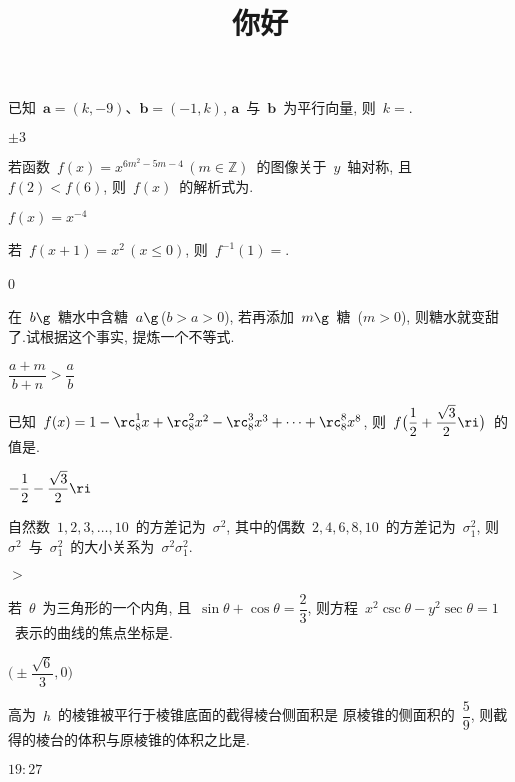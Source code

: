 \documentclass[UTF8,printbox]{BHCexam}
\begin{document}
\title{你好}
\maketitle
\notice

\begin{questions}
\tiankong
\question 已知~$\bm{a}=(k,-9)$、$\bm{b}=(-1,k)$, $\bm{a}$~与~$\bm{b}$~为平行向量,
    则~$k=$\sixb.
\begin{solution}
$\pm3$
\end{solution}
\question 若函数~$f(x)=x^{6m^2-5m-4}\,(m\in\mathbb{Z})$~的图像关于~$y$~轴对称,
    且~$f(2)<f(6)$, 则~$f(x)$~的解析式为\tenb.
\begin{solution}
$f(x)=x^{-4}$
\end{solution}

\question 若~$f(x+1)=x^2\,(x\leq0)$, 则~$f^{-1}(1)=$\sixb.
\begin{solution}
0
\end{solution}

\question 在~$b\g$~糖水中含糖~$a\g$\,($b>a>0$), 若再添加~$m\g$~糖~($m>0$),
    则糖水就变甜了.试根据这个事实, 提炼一个不等式\tenb.
\begin{solution}
$\dfrac{a+m}{b+n}>\dfrac{a}{b}$
\end{solution}

\question 已知~$f(x)=1-\rc_8^1x+\rc_8^2x^2-\rc_8^3x^3+\cdots+\rc_8^8x^8$,
    则~$f\big(\dfrac{1}{2}+\dfrac{\sqrt{3}}{2}\ri\big)$~的值是\sixb\twob{}.
\begin{solution}
$-\dfrac{1}{2}-\dfrac{\sqrt{3}}{2}\ri$
\end{solution}

\question 自然数~$1,2,3,\ldots,10$~的方差记为~$\sigma^2$,
    其中的偶数~$2,4,6,8,10$~的方差记为~$\sigma_1^2$,
    则~$\sigma^2$~与~$\sigma_1^2$~的大小关系为~$\sigma^2$\sixb$\sigma_1^2$.
\begin{solution}
$>$
\end{solution}

\question 若~$\theta$~为三角形的一个内角, 且~$\sin\theta+\cos\theta=\dfrac{2}{3}$,
    则方程~$x^2\csc\theta-y^2\sec\theta=1$~表示的曲线的焦点坐标是\sixb{}.
\begin{solution}
$\big(\pm\dfrac{\sqrt{6}}{3},0\big)$
\end{solution}

\question 高为~$h$~的棱锥被平行于棱锥底面的截得棱台侧面积是
    原棱锥的侧面积的~$\dfrac{5}{9}$,
    则截得的棱台的体积与原棱锥的体积之比是\sixb.
\begin{solution}
$19:27$
\end{solution}


\end{questions}
\end{document}

